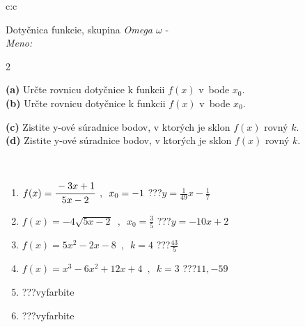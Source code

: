 \documentclass[10pt]{report}
\begin{document}
\begin{tabular}{c:c}
\begin{minipage}[c][104.5mm][t]{0.5\linewidth}
\begin{center}
\vspace{7mm}
{\huge Dotyčnica funkcie, skupina \textit{Omega $\omega$} -}\\[5mm]
\textit{Meno:}\phantom{xxxxxxxxxxxxxxxxxxxxxxxxxxxxxxxxxxxxxxxxxxxxxxxxxxxxxxxxxxxxxxxxx}\\[5mm]
\begin{minipage}{0.95\linewidth}
\begin{center}
{\small \begin{multicols}{2} \raggedright
\textbf{(a)} Určte rovnicu dotyčnice k funkcii \(f(x)\) v~bode \(x_0\). \\[1mm]
\textbf{(b)} Určte rovnicu dotyčnice k funkcii \(f(x)\) v~bode \(x_0\). \par \columnbreak
\textbf{(c)} Zistite y-ové súradnice bodov, v ktorých je sklon \(f(x)\) rovný \(k\). \\[1mm]
\textbf{(d)} Zistite y-ové súradnice bodov, v ktorých je sklon \(f(x)\) rovný \(k\). \\[1mm]
\end{multicols}
}
\end{center}
\end{minipage}
\\[4mm]
\begin{minipage}{0.79\linewidth}
\begin{center}
\begin{varwidth}{\linewidth}
\begin{enumerate}
\normalsizerr
\item $f(x)=\cfrac{-3x+1}{5x-2}\enspace , \enspace x_0=-1$\quad \dotfill\; ???\;\dotfill \quad $y = \frac{1}{49}x-\frac{1}{7}$
\item $f(x)=-4\sqrt{5x-2}\enspace , \enspace x_0=\frac{3}{5}$\quad \dotfill\; ???\;\dotfill \quad $y = -10x+2$
\item $f(x)=5x^2-2x-8\enspace , \enspace k=4$\quad \dotfill\; ???\;\dotfill \quad $\frac{43}{5}$
\item $f(x)=x^3-6x^2+12x+4\enspace , \enspace k=3$\quad \dotfill\; ???\;\dotfill \quad $11 , -59$
\item \quad \dotfill\; ???\;\dotfill \quad vyfarbite
\item \quad \dotfill\; ???\;\dotfill \quad vyfarbite
\end{enumerate}
\end{varwidth}

\end{center}
\end{minipage}
\end{center}
\end{minipage}
\end{tabular}
\end{document}
